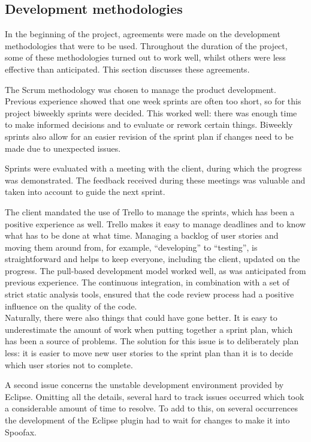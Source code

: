 \subsection{Development methodologies}
\label{ssec:dev-meth}

In the beginning of the project, agreements were made on the development
methodologies that were to be used. Throughout the duration of the project, some
of these methodologies turned out to work well, whilst others were less
effective than anticipated. This section discusses these agreements.

The Scrum methodology was chosen to manage the product development. Previous
experience showed that one week sprints are often too short, so for this project
biweekly sprints were decided. This worked well: there was enough time to make
informed decisions and to evaluate or rework certain things. Biweekly sprints
also allow for an easier revision of the sprint plan if changes need to be
made due to unexpected issues.

Sprints were evaluated with a meeting with the client, during which the progress
was demonstrated. The feedback received during these meetings was valuable and taken
into account to guide the next sprint.

The client mandated the use of Trello to manage the sprints, which has been a
positive experience as well. Trello makes it easy to manage deadlines and to
know what has to be done at what time. Managing a backlog of user stories and
moving them around from, for example, ``developing'' to ``testing'', is
straightforward and helps to keep everyone, including the client, updated on the
progress.
The pull-based development model worked well, as was anticipated from previous
experience. The continuous integration, in combination with a set of strict
static analysis tools, ensured that the code review process had a positive
influence on the quality of the code.\\

Naturally, there were also things that could have gone better. It is easy to
underestimate the amount of work when putting together a sprint plan, which has
been a source of problems. The solution for this issue is to deliberately plan
less: it is easier to move new user stories to the sprint plan than it is to
decide which user stories not to complete.

A second issue concerns the unstable development environment provided by Eclipse.
Omitting all the details, several hard to track issues occurred which took a
considerable amount of time to resolve. To add to this, on several occurrences
the development of the Eclipse plugin had to wait for changes to make it into
Spoofax.

